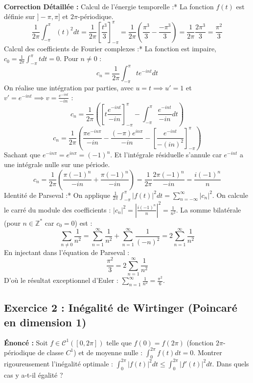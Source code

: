 \documentclass[11pt,a4paper]{article}
\begin{document}
\textbf{Correction Détaillée :}
\textit{ }Calcul de l'énergie temporelle :*
  La fonction $f(t)$ est définie sur $]-\pi, \pi]$ et $2\pi$-périodique.
  $$\frac{1}{2\pi} \int_{-\pi}^\pi (t)^2 dt = \frac{1}{2\pi} \left[ \frac{t^3}{3} \right]_{-\pi}^\pi = \frac{1}{2\pi} \left( \frac{\pi^3}{3} - \frac{-\pi^3}{3} \right) = \frac{1}{2\pi} \frac{2\pi^3}{3} = \frac{\pi^2}{3}$$
\textit{ }Calcul des coefficients de Fourier complexes :*
  La fonction est impaire, $c_0 = \frac{1}{2\pi}\int_{-\pi}^\pi t dt = 0$.
  Pour $n \neq 0$ :
  $$c_n = \frac{1}{2\pi} \int_{-\pi}^\pi t e^{-int} dt$$
  On réalise une intégration par parties, avec $u=t \implies u'=1$ et $v'=e^{-int} \implies v = \frac{e^{-int}}{-in}$ :
  $$c_n = \frac{1}{2\pi} \left( \left[ t \frac{e^{-int}}{-in} \right]_{-\pi}^\pi - \int_{-\pi}^\pi \frac{e^{-int}}{-in} dt \right)$$
  $$c_n = \frac{1}{2\pi} \left( \frac{\pi e^{-in\pi}}{-in} - \frac{(-\pi) e^{in\pi}}{-in} - \left[ \frac{e^{-int}}{-(in)^2} \right]_{-\pi}^\pi \right)$$
  Sachant que $e^{-in\pi} = e^{in\pi} = (-1)^n$. Et l'intégrale résiduelle s'annule car $e^{-int}$ a une intégrale nulle sur une période.
  $$c_n = \frac{1}{2\pi} \left( \frac{\pi (-1)^n}{-in} + \frac{\pi (-1)^n}{-in} \right) = \frac{1}{2\pi} \frac{2\pi (-1)^n}{-in} = \frac{i (-1)^n}{n}$$
\textit{ }Identité de Parseval :*
  On applique $\frac{1}{2\pi} \int_{-\pi}^\pi |f(t)|^2 dt = \sum_{n=-\infty}^\infty |c_n|^2$.
  On calcule le carré du module des coefficients : $|c_n|^2 = \left|\frac{i (-1)^n}{n}\right|^2 = \frac{1}{n^2}$.
  La somme bilatérale (pour $n \in \mathbb{Z}^*$ car $c_0=0$) est :
  $$\sum_{n \neq 0} \frac{1}{n^2} = \sum_{n=1}^\infty \frac{1}{n^2} + \sum_{n=1}^\infty \frac{1}{(-n)^2} = 2 \sum_{n=1}^\infty \frac{1}{n^2}$$
  En injectant dans l'équation de Parseval :
  $$\frac{\pi^2}{3} = 2 \sum_{n=1}^\infty \frac{1}{n^2}$$
  D'où le résultat exceptionnel d'Euler : $\sum_{n=1}^\infty \frac{1}{n^2} = \frac{\pi^2}{6}$.


\subsection{Exercice 2 : Inégalité de Wirtinger (Poincaré en dimension 1)}

\textbf{Énoncé :} Soit $f \in \mathcal{C}^1([0, 2\pi])$ telle que $f(0)=f(2\pi)$ (fonction $2\pi$-périodique de classe $C^1$) et de moyenne nulle : $\int_0^{2\pi} f(t) dt = 0$.
Montrer rigoureusement l'inégalité optimale : $\int_0^{2\pi} |f(t)|^2 dt \le \int_0^{2\pi} |f'(t)|^2 dt$.
Dans quels cas y a-t-il égalité ?
\end{document}
